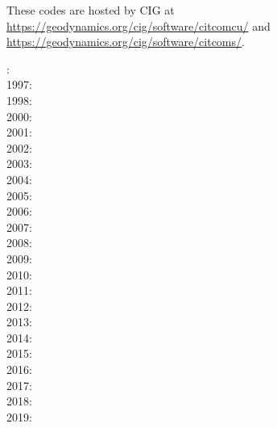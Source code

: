 \begin{itemize}
These codes are hosted by CIG at \url{https://geodynamics.org/cig/software/citcomcu/}
and \url{https://geodynamics.org/cig/software/citcoms/}.

: \cite{somo96}\\
1997: \cite{mole97}\\
1998: \cite{moso98}\cite{zhgm98}\cite{vazh99}\\
2000: \cite{zhzm00}\cite{gumr00}\\
2001: \cite{bigu01}\\
2002: \cite{tagh02}\\
2003: \cite{vazh03}\cite{cogu03}\cite{bigu03}\\
2004: \cite{solo04}\\
2005: \cite{bihi05}\\
2006: \cite{beck06}\cite{pibf06}\cite{tact06}\cite{besb06}\cite{coli06}\\
2007: \cite{bihi07}\cite{zhzl07}\cite{magu07}\cite{bavi07}\cite{rimb07}\cite{mofm07}\cite{cobs07}\\
2008: \cite{dihf08}\cite{gamc08}\cite{zhmt08}\cite{hole08}\\
2009: \cite{lizh09}\cite{arhm09}\cite{zhzm09}\cite{anbi09}\cite{fobe09}\cite{bubi09}\cite{befa09}\cite{lezh09}\\
2010: \cite{bumb10}\cite{vabv10}\cite{baiv10}\cite{bubi10}\cite{zhzl10}\cite{bill10}\cite{jabi10}\\
2011: \cite{befa11}\cite{lemj11}\cite{vaal11}\cite{legu11}\cite{list11}\\
2012: \cite{arbi12}\cite{jabi12}\cite{bija12}\cite{bova12}\cite{hucf12}\cite{zhym12}\cite{solo12}
\cite{hibi12}\cite{jabk12}\cite{mapm12}\\
2013: \cite{bacs13}\cite{bogs13a}\cite{bogs13b}\cite{jabr13}\cite{qula13}\cite{oldh13}\cite{arbi13}\cite{cost13}\\
2014: \cite{flgw14}\cite{budt14}\cite{kava14}\cite{arfw14}\cite{wavp14}\cite{seki14}\cite{agvg14}
\cite{mabv14}\cite{zhu14}\\
2015: \cite{bacs15}\cite{bogf15}\cite{bomv15}\cite{sefw15}\cite{daso15}\cite{vami15}\cite{wazh15}
\cite{wavp15}\cite{waav15}\cite{hafg15}\cite{tarn15}\cite{legu15}\\
2016: \cite{welm16}\cite{wele16}\cite{jada16}\cite{frbs16}\\
2017: \cite{aggv17}\cite{maav17}\cite{frbm17}\cite{haja17}\\
2018: \cite{hect18}\cite{king18}\cite{kavb18}\cite{wavp18}\\
2019: \cite{mavb19}\cite{fube19}\cite{magn19}\cite{malg19}\cite{mazh19}



\end{itemize}
